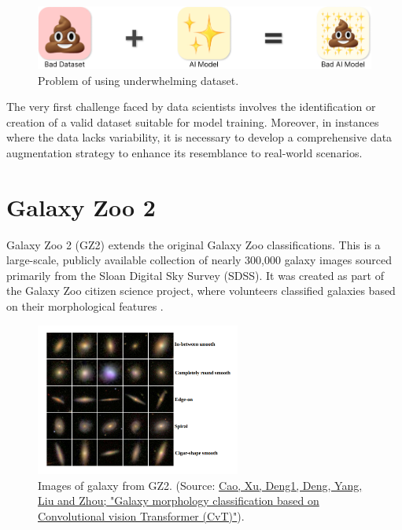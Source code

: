 \begin{figure}[htbp]
    \centering
    \includegraphics[width=0.8\linewidth]{obrazky-figures/03-dataset/bad-ds.png}
    \caption{Problem of using underwhelming dataset.}
    \label{fig:bad-ds}
\end{figure}

The very first challenge faced by data scientists involves the identification or creation of a valid dataset suitable for model training. Moreover, in instances where the data lacks variability, it is necessary to develop a comprehensive data augmentation strategy to enhance its resemblance to real-world scenarios.

\section{Galaxy Zoo 2}
\label{sec:gz2-dataset}

Galaxy Zoo 2 (GZ2) extends the original Galaxy Zoo classifications. This is a large-scale, publicly available collection of nearly 300,000 galaxy images sourced primarily from the Sloan Digital Sky Survey (SDSS). It was created as part of the Galaxy Zoo citizen science project, where volunteers classified galaxies based on their morphological features \cite{Willett_2013}.

\begin{figure}[htbp]
    \centering
    \includegraphics[width=0.6\textwidth]{obrazky-figures/03-dataset/gz2-images.png}
    \caption{Images of galaxy from GZ2. (Source: \href{https://www.aanda.org/articles/aa/full_html/2024/03/aa48544-23/aa48544-23.html\#F2}{Cao, Xu, Deng1, Deng, Yang, Liu and Zhou; "Galaxy morphology classification based on Convolutional vision Transformer (CvT)"}).}
    \label{fig:gz2-images}
\end{figure}

